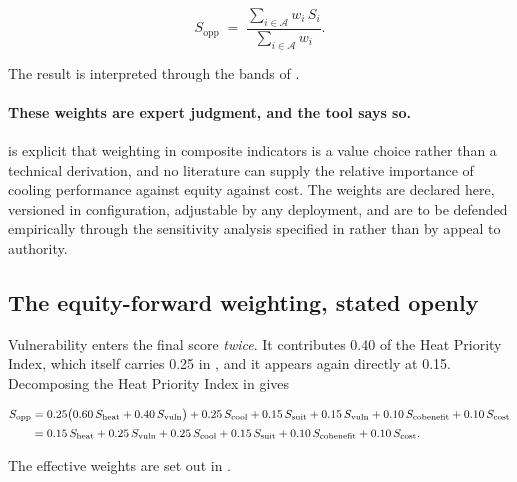\begin{equation}
\label{eq:aggregation-redistributed}
S_{\mathrm{opp}} \;=\;
\frac{\displaystyle\sum_{i \in \mathcal{A}} w_i\,S_i}
     {\displaystyle\sum_{i \in \mathcal{A}} w_i} .
\end{equation}

The result is interpreted through the bands of .

\paragraph{These weights are expert judgment, and the tool says so.}
\textcite{nardo2008} is explicit that weighting in composite indicators is a
value choice rather than a technical derivation, and no literature can supply
the relative importance of cooling performance against equity against cost. The
weights are declared here, versioned in configuration, adjustable by any
deployment, and are to be defended empirically through the sensitivity analysis
specified in  rather than by appeal to authority.

\subsection{The equity-forward weighting, stated openly}
\label{sec:effective-weights}

Vulnerability enters the final score \emph{twice}. It contributes \num{0.40} of
the Heat Priority Index, which itself carries \num{0.25} in
, and it appears again directly at \num{0.15}. Decomposing
the Heat Priority Index in  gives

\begin{align}
S_{\mathrm{opp}} &=
  0.25\bigl(0.60\,S_{\mathrm{heat}} + 0.40\,S_{\mathrm{vuln}}\bigr)
+ 0.25\,S_{\mathrm{cool}} + 0.15\,S_{\mathrm{suit}} + 0.15\,S_{\mathrm{vuln}}
+ 0.10\,S_{\mathrm{cobenefit}} + 0.10\,S_{\mathrm{cost}} \notag \\[2pt]
\label{eq:effective}
&= 0.15\,S_{\mathrm{heat}} + 0.25\,S_{\mathrm{vuln}} + 0.25\,S_{\mathrm{cool}}
 + 0.15\,S_{\mathrm{suit}} + 0.10\,S_{\mathrm{cobenefit}}
 + 0.10\,S_{\mathrm{cost}} .
\end{align}

The effective weights are set out in .

